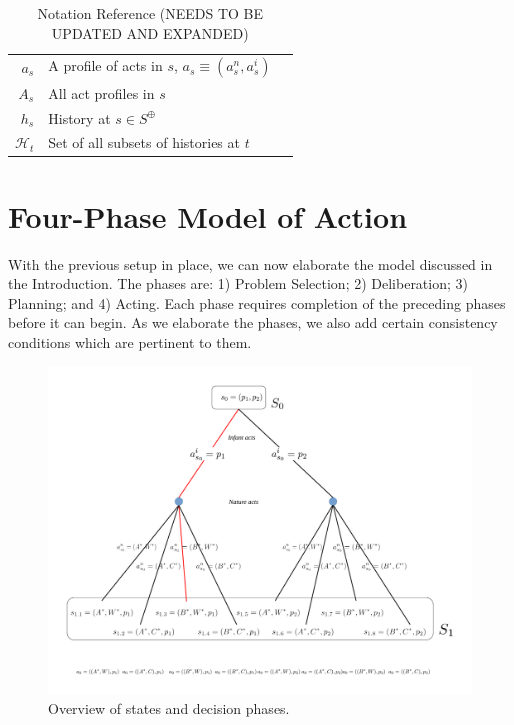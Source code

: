 \documentclass[
11pt,
titlepage,
reqno,
]{article}%
\theoremstyle{definition}
\begin{document}
\begin{table}
\begin{tabular}{@{}rll@{}}
$a_s$                                       & A profile of acts in $s$, $a_s\equiv(a^n_s,a^i_s)$ & \\
$A_s$                                    & All act profiles in $s$                               & \\
$h_s$                                & History at $s\in S^\oplus$                                    &  \\
$\mathcal{H}_t$                                    & Set of all subsets of histories at $t$                & \\
\bottomrule
\end{tabular}
\caption{Notation Reference (NEEDS TO BE UPDATED AND EXPANDED)}\label{Tab: Notation}
\end{table}
\pagebreak

\section{Four-Phase Model of Action}

With the previous setup in place, we can now elaborate the model discussed in the Introduction.
The phases are: 1) Problem Selection; 2) Deliberation; 3) Planning; and 4) Acting.
Each phase requires completion of the preceding phases before it can begin.
As we elaborate the phases, we also add certain consistency conditions which are pertinent to them.


\begin{figure}[h!]
	\centering
	\includegraphics*[page=9,trim = 0in 3in 0in 0in,scale=.65]{Awareness_Diagrams_All}
	\caption{Overview of states and decision phases.\label{Diag: p-09}}%
\end{figure}
\end{document}
